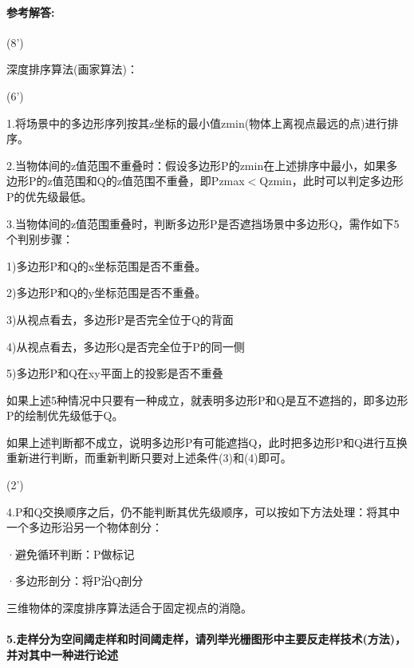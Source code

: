 \documentclass[12pt,a4paper,UTF8]{ctexart}
\begin{document}
	\paragraph{参考解答:}(8')
	\par 深度排序算法(画家算法)：
	\par (6')
	\par 1.将场景中的多边形序列按其z坐标的最小值zmin(物体上离视点最远的点)进行排序。
	\par 2.当物体间的z值范围不重叠时：假设多边形P的zmin在上述排序中最小，如果多边形P的z值范围和Q的z值范围不重叠，即Pzmax$<$Qzmin，此时可以判定多边形P的优先级最低。
	\par 3.当物体间的z值范围重叠时，判断多边形P是否遮挡场景中多边形Q，需作如下5个判别步骤：
	\par 1)多边形P和Q的x坐标范围是否不重叠。
	\par 2)多边形P和Q的y坐标范围是否不重叠。
	\par 3)从视点看去，多边形P是否完全位于Q的背面
	\par 4)从视点看去，多边形Q是否完全位于P的同一侧
	\par 5)多边形P和Q在xy平面上的投影是否不重叠
	\par 如果上述5种情况中只要有一种成立，就表明多边形P和Q是互不遮挡的，即多边形P的绘制优先级低于Q。
	\par 如果上述判断都不成立，说明多边形P有可能遮挡Q，此时把多边形P和Q进行互换重新进行判断，而重新判断只要对上述条件(3)和(4)即可。
	\par (2')
	\par 4.P和Q交换顺序之后，仍不能判断其优先级顺序，可以按如下方法处理：将其中一个多边形沿另一个物体剖分：
	\par ·避免循环判断：P做标记
	\par ·多边形剖分：将P沿Q剖分
	\par 三维物体的深度排序算法适合于固定视点的消隐。
	\paragraph{5.走样分为空间阈走样和时间阈走样，请列举光栅图形中主要反走样技术(方法)，并对其中一种进行论述}
\end{document}
